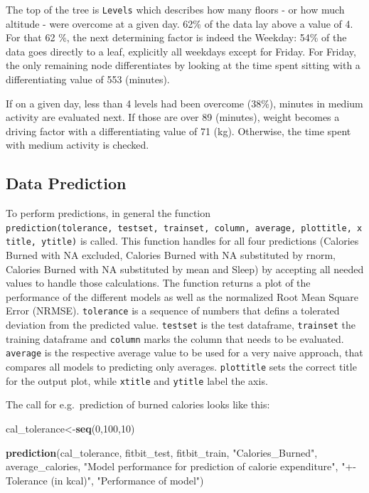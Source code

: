 \documentclass[
]{article}
\newenvironment{Shaded}{\begin{snugshade}}{\end{snugshade}}
\newcommand{\DecValTok}[1]{\textcolor[rgb]{0.00,0.00,0.81}{#1}}
\newcommand{\KeywordTok}[1]{\textcolor[rgb]{0.13,0.29,0.53}{\textbf{#1}}}
\newcommand{\NormalTok}[1]{#1}
\newcommand{\StringTok}[1]{\textcolor[rgb]{0.31,0.60,0.02}{#1}}
\begin{document}
The top of the tree is \texttt{Levels} which describes how many floors -
or how much altitude - were overcome at a given day. 62\% of the data
lay above a value of 4. For that 62 \%, the next determining factor is
indeed the Weekday: 54\% of the data goes directly to a leaf, explicitly
all weekdays except for Friday. For Friday, the only remaining node
differentiates by looking at the time spent sitting with a
differentiating value of 553 (minutes).

If on a given day, less than 4 levels had been overcome (38\%), minutes
in medium activity are evaluated next. If those are over 89 (minutes),
weight becomes a driving factor with a differentiating value of 71 (kg).
Otherwise, the time spent with medium activity is checked.

\hypertarget{data-prediction}{%
\subsection{Data Prediction}\label{data-prediction}}

To perform predictions, in general the function
\texttt{prediction(tolerance,\ testset,\ trainset,\ column,\ average,\ plottitle,\ xtitle,\ ytitle)}
is called. This function handles for all four predictions (Calories
Burned with NA excluded, Calories Burned with NA substituted by rnorm,
Calories Burned with NA substituted by mean and Sleep) by accepting all
needed values to handle those calculations. The function returns a plot
of the performance of the different models as well as the normalized
Root Mean Square Error (NRMSE). \texttt{tolerance} is a sequence of
numbers that defins a tolerated deviation from the predicted value.
\texttt{testset} is the test dataframe, \texttt{trainset} the training
dataframe and \texttt{column} marks the column that needs to be
evaluated. \texttt{average} is the respective average value to be used
for a very naive approach, that compares all models to predicting only
averages. \texttt{plottitle} sets the correct title for the output plot,
while \texttt{xtitle} and \texttt{ytitle} label the axis.

The call for e.g.~prediction of burned calories looks like this:

\begin{Shaded}
\begin{Highlighting}[]
\NormalTok{cal_tolerance<-}\KeywordTok{seq}\NormalTok{(}\DecValTok{0}\NormalTok{,}\DecValTok{100}\NormalTok{,}\DecValTok{10}\NormalTok{)}

\KeywordTok{prediction}\NormalTok{(cal_tolerance, fitbit_test, fitbit_train, }\StringTok{"Calories_Burned"}\NormalTok{,}
\NormalTok{           average_calories,}
           \StringTok{"Model performance for prediction of calorie expenditure"}\NormalTok{,}
           \StringTok{"+-Tolerance (in kcal)"}\NormalTok{, }\StringTok{"Performance of model"}\NormalTok{)}
\end{Highlighting}
\end{Shaded}
\end{document}
